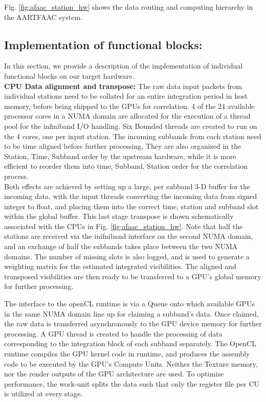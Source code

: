 \documentclass{ws-jai}
\begin{document}
Fig. \ref{fig:afaac_station_hw}  shows the data routing  and computing hierarchy
in the AARTFAAC system.

\subsection {Implementation of functional  blocks:} 

In this  section, we provide a  description of the implementation  of individual
functional blocks on our target hardware.\\
\noindent \textbf {CPU Data alignment and transpose:} The raw data input packets
from individual stations need to be collated for an entire integration period in
host memory,  before being  shipped to the  GPUs for correlation.   4 of  the 24
available processor cores in a NUMA domain  are allocated for the execution of a
thread pool for the infiniband I/O  handling. Six Bounded threads are created to
run on  the 4  cores, one per  input station.  The  incoming subbands  from each
station  need to  be  time aligned  before further  processing.   They are  also
organized in the {Station, Time, Subband}  order by the upstream hardware, while
it is more efficient to reorder them into {time, Subband, Station} order for the
correlation process.\\  Both effects  are achieved  by setting  up a  large, per
subband 3-D buffer for the incoming  data, with the input threads converting the
incoming data  from signed integer to  float, and placing them  into the correct
time,  station and  subband  slot within  the global  buffer.   This last  stage
transpose    is   shown    schematically   associated    with   the    CPUs   in
Fig. \ref{fig:afaac_station_hw}.   Note that  half the stations  are received
via the inifniband interface on the second  NUMA domain, and an exchange of half
the subbands  takes place between  the two NUMA  domains. The number  of missing
slots  is also  logged, and  is  used to  generate  a weighting  matrix for  the
estimated integrated  visibilities. The aligned and  transposed visibilities are
then ready to be transferred to a GPU's global memory for further processing.

The interface to the openCL runtime is  via a Queue onto which available GPUs in
the same NUMA domain  line up for claiming a subband's  data.  Once claimed, the
raw data  is transferred  asynchronously to  the GPU  device memory  for further
processing.   A  GPU  thread  is  created  to  handle  the  processing  of  data
corresponding to the  integration block of each subband  separately.  The OpenCL
runtime compiles the GPU kernel code  in runtime, and produces the assembly code
to be executed by  the GPU's Compute Units. Neither the  Texture memory, nor the
render outputs  of the GPU architecture  are used. To optimize  performance, the
work-unit splits the data such that only the register file per CU is utilized at
every stage.\\
\end{document}
